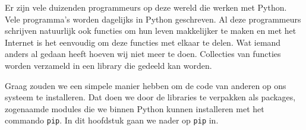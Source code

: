Er zijn vele duizenden programmeurs op deze wereld die werken met Python. Vele programma's worden dagelijks in Python geschreven. Al deze programmeurs schrijven natuurlijk ook functies om hun leven makkelijker te maken en met het Internet is het eenvoudig om deze functies met elkaar te delen. Wat iemand anders al gedaan heeft hoeven wij niet meer te doen. Collecties van functies worden verzameld in een library die gedeeld kan worden.

Graag zouden we een simpele manier hebben om de code van anderen op ons systeem te installeren. Dat doen we door de libraries te verpakken als packages, zogenaamde modules die we binnen Python kunnen installeren met het commando \texttt{pip}. In dit hoofdstuk gaan we nader op \texttt{pip} in.

